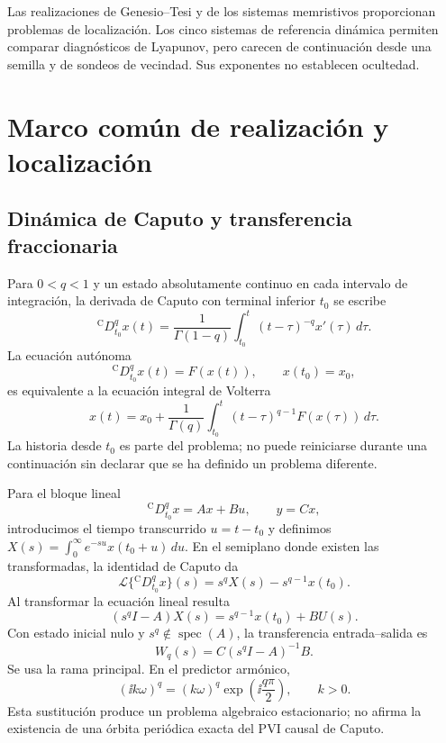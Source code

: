Las realizaciones de Genesio--Tesi y de los sistemas memristivos proporcionan
problemas de localización. Los cinco sistemas de referencia dinámica permiten
comparar diagnósticos de Lyapunov, pero carecen de continuación desde una
semilla y de sondeos de vecindad. Sus exponentes no establecen ocultedad.

\section[Marco común de realización]{Marco común de realización y localización}

\subsection{Dinámica de Caputo y transferencia fraccionaria}

Para \(0<q<1\) y un estado absolutamente continuo en cada intervalo de
integración, la derivada de Caputo con terminal inferior \(t_0\) se escribe
\begin{equation}
 {}^{\mathrm C}D_{t_0}^{q}x(t)
 =\frac{1}{\Gamma(1-q)}
 \int_{t_0}^{t}(t-\tau)^{-q}x'(\tau)\,d\tau .
 \label{nc:eq:caputo}
\end{equation}
La ecuación autónoma
\begin{equation}
 {}^{\mathrm C}D_{t_0}^{q}x(t)=F(x(t)),\qquad x(t_0)=x_0,
 \label{nc:eq:ivp}
\end{equation}
es equivalente a la ecuación integral de Volterra
\begin{equation}
 x(t)=x_0+\frac{1}{\Gamma(q)}
 \int_{t_0}^{t}(t-\tau)^{q-1}F(x(\tau))\,d\tau .
 \label{nc:eq:volterra}
\end{equation}
La historia desde \(t_0\) es parte del problema; no puede reiniciarse durante
una continuación sin declarar que se ha definido un problema diferente.

Para el bloque lineal
\begin{equation}
 {}^{\mathrm C}D_{t_0}^{q}x=Ax+Bu,
 \qquad y=Cx,
 \label{nc:eq:linear-block}
\end{equation}
introducimos el tiempo transcurrido \(u=t-t_0\) y definimos
\(X(s)=\int_0^\infty e^{-su}x(t_0+u)\,du\). En el semiplano donde
existen las transformadas, la identidad de Caputo da
\begin{equation}
 \mathcal L\{{}^{\mathrm C}D_{t_0}^{q}x\}(s)
 =s^qX(s)-s^{q-1}x(t_0).
\end{equation}
Al transformar la ecuación lineal resulta
\[
 (s^qI-A)X(s)=s^{q-1}x(t_0)+BU(s).
\]
Con estado inicial nulo y \(s^q\notin\operatorname{spec}(A)\),
la transferencia entrada--salida es
\begin{equation}
 W_q(s)=C(s^qI-A)^{-1}B.
 \label{nc:eq:transfer-general}
\end{equation}
Se usa la rama principal. En el predictor armónico,
\begin{equation}
 (\ii k\omega)^q=(k\omega)^q
 \exp\!\left(\ii\frac{q\pi}{2}\right),\qquad k>0.
 \label{nc:eq:principal-branch}
\end{equation}
Esta sustitución produce un problema algebraico estacionario; no afirma la
existencia de una órbita periódica exacta del PVI causal de Caputo.

